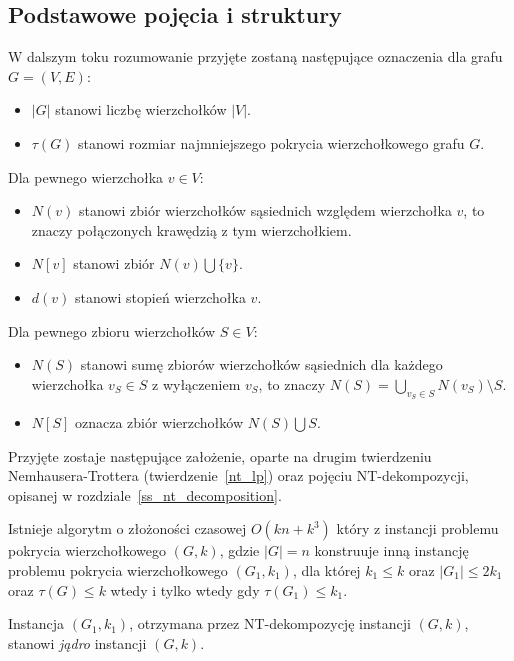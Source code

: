 \subsection{Podstawowe pojęcia i struktury}\label{ss_ckx_preliminaries}
\par{
  W dalszym toku rozumowanie przyjęte zostaną następujące oznaczenia dla grafu $G=(V, E)$:
  \begin{itemize}
    \item $|G|$ stanowi liczbę wierzchołków $|V|$.
    \item $\tau(G)$ stanowi rozmiar najmniejszego pokrycia wierzchołkowego grafu $G$.
  \end{itemize}
  Dla pewnego wierzchołka $v \in V$:
  \begin{itemize}
    \item $N(v)$ stanowi zbiór wierzchołków sąsiednich względem wierzchołka $v$, to znaczy połączonych krawędzią z tym wierzchołkiem.
    \item $N[v]$ stanowi zbiór $N(v) \bigcup \{v\}$.
    \item $d(v)$ stanowi stopień wierzchołka $v$.
  \end{itemize}
  Dla pewnego zbioru wierzchołków $S \in V$:
  \begin{itemize}
    \item $N(S)$ stanowi sumę zbiorów wierzchołków sąsiednich dla każdego wierzchołka $v_S \in S$ z wyłączeniem $v_S$, to znaczy $N(S)=\bigcup_{v_S\in S}N(v_S) \setminus S$.
    \item $N[S]$ oznacza zbiór wierzchołków $N(S) \bigcup S$.
  \end{itemize}

  Przyjęte zostaje następujące założenie, oparte na drugim twierdzeniu Nemhausera-Trottera (twierdzenie~\ref{nt_lp}) oraz pojęciu NT-dekompozycji, opisanej w rozdziale~\ref{ss_nt_decomposition}.
  \begin{proposition}
    Istnieje algorytm o złożoności czasowej $O(kn + k^3)$ który z instancji problemu pokrycia wierzchołkowego $(G, k)$, gdzie $|G|=n$ konstruuje inną instancję problemu  pokrycia wierzchołkowego $(G_1, k_1)$, dla której $k_1 \leq k$ oraz $|G_1| \leq 2k_1$ oraz $\tau(G) \leq k$ wtedy i tylko wtedy gdy $\tau(G_1) \leq k_1$.
  \end{proposition}

  \begin{definition}
    Instancja $(G_1, k_1)$, otrzymana przez NT-dekompozycję instancji $(G, k)$, stanowi \emph{jądro} instancji $(G, k)$.
  \end{definition}
}
